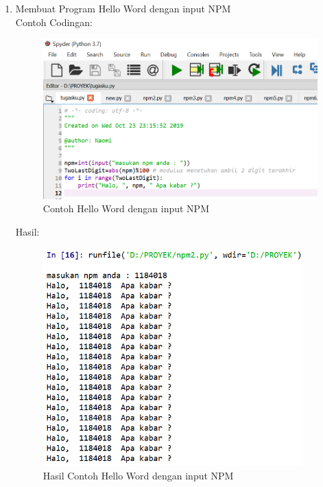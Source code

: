 \begin{enumerate}
    \newpage
    \item Membuat Program Hello Word dengan input NPM\\ 
    Contoh Codingan:
    \begin{figure}[!htbp]
    \centering
    \includegraphics[width=11cm]{gambar2/halo.png}
    \caption{Contoh Hello Word dengan input NPM}
    \end{figure}
    Hasil:
    \begin{figure}[!htbp]
    \centering
    \includegraphics[width=10cm]{gambar2/halo1.png}
    \caption{Hasil Contoh Hello Word dengan input NPM}
    \end{figure}
    

\end{enumerate}
